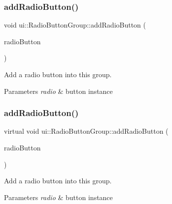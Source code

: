 \subsubsection{\texorpdfstring{add\+Radio\+Button()}{addRadioButton()}\hspace{0.1cm}{\footnotesize\ttfamily [1/2]}}
{\footnotesize\ttfamily void ui\+::\+Radio\+Button\+Group\+::add\+Radio\+Button (\begin{DoxyParamCaption}\item[{\hyperlink{classui_1_1RadioButton}{Radio\+Button} $\ast$}]{radio\+Button }\end{DoxyParamCaption})\hspace{0.3cm}{\ttfamily [virtual]}}

Add a radio button into this group.


\begin{DoxyParams}{Parameters}
{\em radio} & button instance \\
\hline
\end{DoxyParams}
\mbox{\label{classui_1_1RadioButtonGroup_a4c69239f0f782877e4aefb217f0e03f2}} 
\subsubsection{\texorpdfstring{add\+Radio\+Button()}{addRadioButton()}\hspace{0.1cm}{\footnotesize\ttfamily [2/2]}}
{\footnotesize\ttfamily virtual void ui\+::\+Radio\+Button\+Group\+::add\+Radio\+Button (\begin{DoxyParamCaption}\item[{\hyperlink{classui_1_1RadioButton}{Radio\+Button} $\ast$}]{radio\+Button }\end{DoxyParamCaption})\hspace{0.3cm}{\ttfamily [virtual]}}

Add a radio button into this group.


\begin{DoxyParams}{Parameters}
{\em radio} & button instance \\
\hline
\end{DoxyParams}
\mbox{\label{classui_1_1RadioButtonGroup_a9832b6d251d9d50ac3cdcb73b31cf5ec}} 
